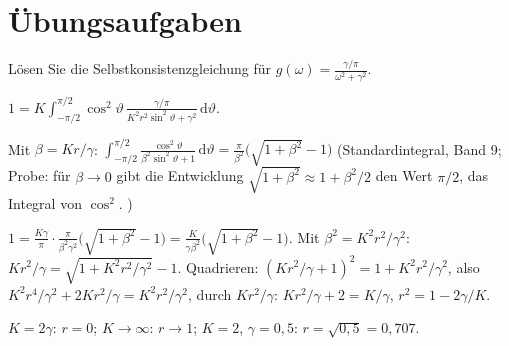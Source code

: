\section{Übungsaufgaben}

\begin{aufgabe}
Lösen Sie die Selbstkonsistenzgleichung für $g(\omega) = \frac{\gamma/\pi}{\omega^{2}+\gamma^{2}}$.

\loesung
{}
$1 = K\int_{-\pi/2}^{\pi/2}\cos^{2}\vartheta\,\frac{\gamma/\pi}{K^{2}r^{2}\sin^{2}\vartheta + \gamma^{2}}\,\mathrm d\vartheta$.

Mit $\beta = Kr/\gamma$: $\int_{-\pi/2}^{\pi/2}\frac{\cos^{2}\vartheta}{\beta^{2}\sin^{2}\vartheta + 1}\,\mathrm d\vartheta = \frac{\pi}{\beta^{2}}\bigl(\sqrt{1+\beta^{2}} - 1\bigr)$ (Standardintegral, Band 9; Probe: für $\beta\to0$ gibt die Entwicklung $\sqrt{1+\beta^{2}}\approx 1 + \beta^{2}/2$ den Wert $\pi/2$, das Integral von $\cos^{2}$. \checkmark)

$1 = \frac{K\gamma}{\pi}\cdot\frac{\pi}{\beta^{2}\gamma^{2}}\bigl(\sqrt{1+\beta^{2}} - 1\bigr) = \frac{K}{\gamma\beta^{2}}\bigl(\sqrt{1+\beta^{2}}-1\bigr)$. Mit $\beta^{2} = K^{2}r^{2}/\gamma^{2}$: $K r^{2}/\gamma = \sqrt{1 + K^{2}r^{2}/\gamma^{2}} - 1$. Quadrieren: $(Kr^{2}/\gamma + 1)^{2} = 1 + K^{2}r^{2}/\gamma^{2}$, also $K^{2}r^{4}/\gamma^{2} + 2Kr^{2}/\gamma = K^{2}r^{2}/\gamma^{2}$, durch $Kr^{2}/\gamma$: $Kr^{2}/\gamma + 2 = K/\gamma$, $r^{2} = 1 - 2\gamma/K$. \checkmark

$K = 2\gamma$: $r = 0$; $K\to\infty$: $r\to1$; $K = 2$, $\gamma = 0{,}5$: $r = \sqrt{0{,}5} = 0{,}707$. \checkmark
\end{aufgabe}

